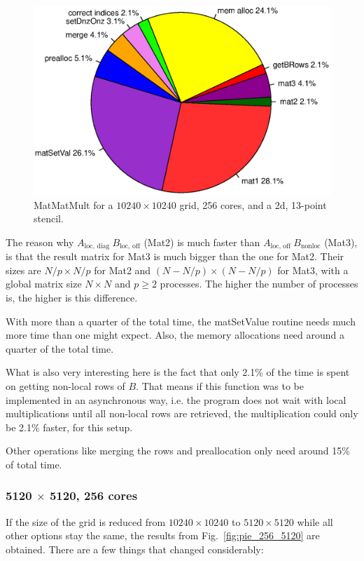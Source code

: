 \begin{figure}[tbp]
	\centering
	\includegraphics[width=1\textwidth, trim={0 3.cm 0 3cm},clip]{256cores_10240}
	\caption{MatMatMult for a $10240\times 10240$ grid, 256 cores, and a 2d, 13-point stencil.} 
	\label{fig:pie_256_10240}
\end{figure}

The reason why $A_{\textrm{loc, diag~}} B_{\textrm{loc, off}}$ (Mat2) is much faster than $A_{\textrm{loc, off~}} B_{\textrm{nonloc}}$ (Mat3), is that the result matrix for Mat3 is much bigger than the one for Mat2. Their sizes are $N/p \times N/p$ for Mat2 and $(N-N/p) \times (N-N/p)$ for Mat3, with a global matrix size $N\times N$ and $p\geq2$ processes. The higher the number of processes is, the higher is this difference.

With more than a quarter of the total time, the matSetValue routine needs much more time than one might expect. Also, the memory allocations need around a quarter of the total time. 

What is also very interesting here is the fact that only 2.1\% of the time is spent on getting non-local rows of $B$. That means if this function was to be implemented in an asynchronous way, i.e. the program does not wait with local multiplications until all non-local rows are retrieved, the multiplication could only be 2.1\% faster, for this setup. 

Other operations like merging the rows and preallocation only need around 15\% of total time.



\subsubsection*{5120 $\times$ 5120, 256 cores}
If the size of the grid is reduced from $10240 \times 10240$ to $5120 \times 5120$ while all other options stay the same, the results from Fig.~\ref{fig:pie_256_5120} are obtained. There are a few things that changed considerably: 


